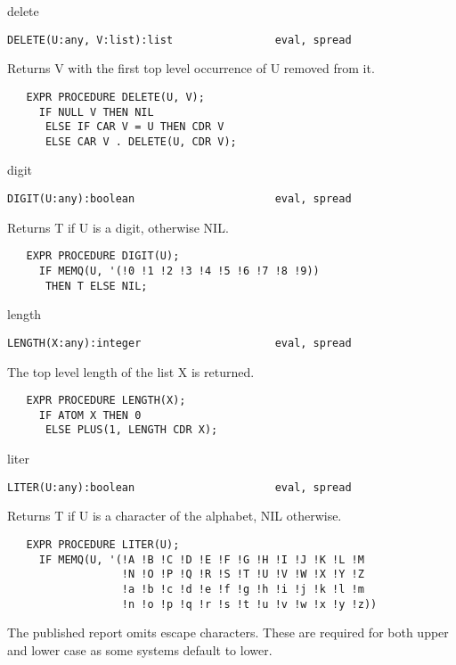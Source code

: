 \begin{Function}{delete}
\begin{verbatim}
DELETE(U:any, V:list):list                eval, spread
\end{verbatim}  
   Returns  V with  the first top  level occurrence  of U removed
   from it.
\begin{verbatim}
   EXPR PROCEDURE DELETE(U, V);
     IF NULL V THEN NIL
      ELSE IF CAR V = U THEN CDR V
      ELSE CAR V . DELETE(U, CDR V);
\end{verbatim}
\end{Function}
\begin{Function}{digit}
\begin{verbatim}
DIGIT(U:any):boolean                      eval, spread
\end{verbatim}
   Returns T if U is a digit, otherwise NIL.
\begin{verbatim}
   EXPR PROCEDURE DIGIT(U);
     IF MEMQ(U, '(!0 !1 !2 !3 !4 !5 !6 !7 !8 !9))
      THEN T ELSE NIL;
\end{verbatim}
\end{Function}
\begin{Function}{length}
\begin{verbatim}
LENGTH(X:any):integer                     eval, spread
\end{verbatim}
   The top level length of the list X is returned.
\begin{verbatim}
   EXPR PROCEDURE LENGTH(X);
     IF ATOM X THEN 0
      ELSE PLUS(1, LENGTH CDR X);
\end{verbatim}

\end{Function}
\begin{Function}{liter}
\begin{verbatim}
LITER(U:any):boolean                      eval, spread
\end{verbatim}
   Returns   T  if  U  is  a  character   of  the  alphabet,  NIL
   otherwise.
\begin{verbatim}
   EXPR PROCEDURE LITER(U);
     IF MEMQ(U, '(!A !B !C !D !E !F !G !H !I !J !K !L !M
                  !N !O !P !Q !R !S !T !U !V !W !X !Y !Z
                  !a !b !c !d !e !f !g !h !i !j !k !l !m
                  !n !o !p !q !r !s !t !u !v !w !x !y !z))
\end{verbatim}
     The  published report  omits escape  characters.   These are
   required  for  both  upper  and  lower  case  as  some systems
   default to lower.

\end{Function}
